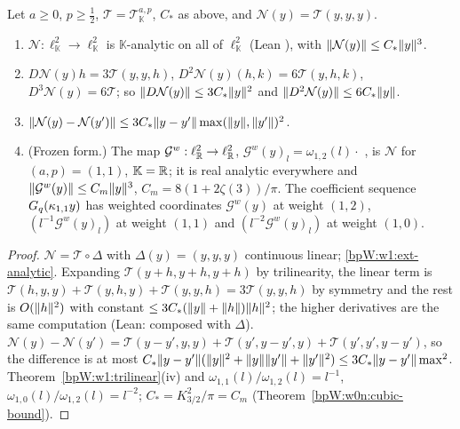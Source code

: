 \begin{corollary}\label{bpW:w1:cubic-analytic}
Let $a\ge0$, $p\ge\frac12$, $\mathcal T=\mathcal T^{a,p}_{\mathbb K}$, $C_*$ as above, and $\mathcal N(y)=\mathcal T(y,y,y)$.
\begin{enumerate}[label=(\roman*)]
\item $\mathcal N:\ell^2_{\mathbb K}\to\ell^2_{\mathbb K}$ is $\mathbb K$-analytic on all of $\ell^2_{\mathbb K}$ (Lean
  ), with $\lVert \mathcal N(y)\rVert\le C_*\lVert y\rVert^3$.
\item $D\mathcal N(y)h=3\mathcal T(y,y,h)$, $D^2\mathcal N(y)(h,k)=6\mathcal T(y,h,k)$, $D^3\mathcal N(y)=6\mathcal T$;
  so $\lVert D\mathcal N(y)\rVert\le3C_*\lVert y\rVert^2$ and $\lVert D^2\mathcal N(y)\rVert\le6C_*\lVert y\rVert$.
\item $\lVert \mathcal N(y)-\mathcal N(y')\rVert\le3C_*\lVert y-y'\rVert\max(\lVert y\rVert,\lVert y'\rVert)^2$.
\item (Frozen form.) The map $\mathcal G^w:\ell^2_{\mathbb{R}}\to\ell^2_{\mathbb{R}}$, $\mathcal G^w(y)_l=\omega_{1,2}(l)\cdot$
  , is $\mathcal N$ for $(a,p)=(1,1)$, $\mathbb K=\mathbb{R}$; it is real analytic everywhere and
  $\lVert \mathcal G^w(y)\rVert\le C_m\lVert y\rVert^3$, $C_m=8(1+2\zeta(3))/\pi$. The coefficient sequence $G_q(\kappa_{1,1}y)$
  has weighted coordinates $\mathcal G^w(y)$ at weight $(1,2)$, $(l^{-1}\mathcal G^w(y)_l)$ at weight $(1,1)$ and
  $(l^{-2}\mathcal G^w(y)_l)$ at weight $(1,0)$.
\end{enumerate}
\end{corollary}

\begin{proof}
\label{stepW:w1:can}
$\mathcal N=\mathcal T\circ\Delta$ with $\Delta(y)=(y,y,y)$ continuous linear; \ref{bpW:w1:ext-analytic}.
\label{stepW:w1:cder}
Expanding $\mathcal T(y+h,y+h,y+h)$ by trilinearity, the linear term is $\mathcal T(h,y,y)+\mathcal T(y,h,y)+
\mathcal T(y,y,h)=3\mathcal T(y,y,h)$ by symmetry and the rest is $O(\lVert h\rVert^2)$ with constant $\le3C_*(\lVert y\rVert+\lVert h\rVert)\lVert h\rVert^2$;
the higher derivatives are the same computation (Lean:  composed with
$\Delta$).
\label{stepW:w1:clip}
$\mathcal N(y)-\mathcal N(y')=\mathcal T(y-y',y,y)+\mathcal T(y',y-y',y)+\mathcal T(y',y',y-y')$, so the difference is
at most $C_*\lVert y-y'\rVert(\lVert y\rVert^2+\lVert y\rVert\lVert y'\rVert+\lVert y'\rVert^2)\le3C_*\lVert y-y'\rVert\max^2$.
\label{stepW:w1:cfrozen}
Theorem~\ref{bpW:w1:trilinear}(iv) and $\omega_{1,1}(l)/\omega_{1,2}(l)=l^{-1}$, $\omega_{1,0}(l)/\omega_{1,2}(l)=l^{-2}$;
$C_*=K_{3/2}^2/\pi=C_m$ (Theorem~\ref{bpW:w0n:cubic-bound}).
\end{proof}


